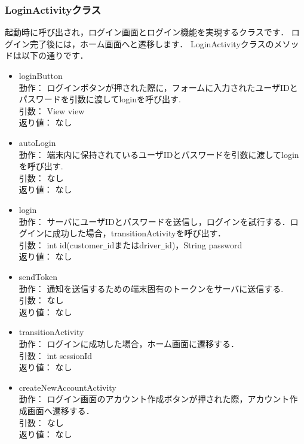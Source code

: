 \documentclass[a4j,titlepage]{jarticle}
\begin{document}
\subsubsection{LoginActivityクラス}
起動時に呼び出され，ログイン画面とログイン機能を実現するクラスです．
ログイン完了後には，ホーム画面へと遷移します．
LoginActivityクラスのメソッドは以下の通りです．
\begin{itemize}
\item loginButton\\
動作： ログインボタンが押された際に，フォームに入力されたユーザIDとパスワードを引数に渡してloginを呼び出す.\\
引数： View view\\
返り値： なし
  
\item autoLogin\\
動作： 端末内に保持されているユーザIDとパスワードを引数に渡してloginを呼び出す.\\
引数： なし\\
返り値： なし

\item login\\
動作： サーバにユーザIDとパスワードを送信し，ログインを試行する．ログインに成功した場合，transitionActivityを呼び出す．\\
引数： int id(customer\verb|_|idまたはdriver\verb|_|id)，String password\\
返り値： なし

\item sendToken\\
動作： 通知を送信するための端末固有のトークンをサーバに送信する.\\
引数： なし\\
返り値： なし

\item transitionActivity\\
動作： ログインに成功した場合，ホーム画面に遷移する．\\
引数： int sessionId\\
返り値： なし

\item createNewAccountActivity\\
動作： ログイン画面のアカウント作成ボタンが押された際，アカウント作成画面へ遷移する．\\
引数： なし\\
返り値： なし
\end{itemize}
\end{document}
